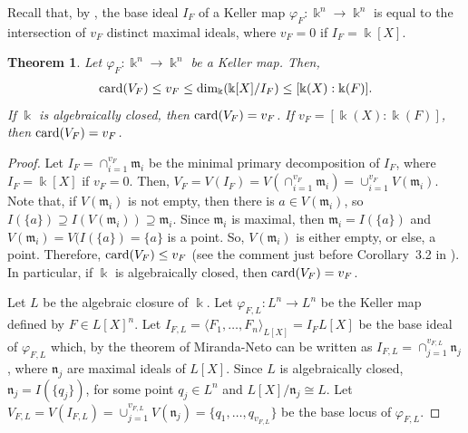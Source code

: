 \documentclass[11pt,reqno]{amsart}
\newtheorem{theorem}{Theorem}[section]
\theoremstyle{definition}
\newcommand{\mbk}{\mbox{$\Bbbk$}}
\newcommand{\mfm}{\mbox{$\mathfrak{m}$}}
\newcommand{\mfn}{\mbox{$\mathfrak{n}$}}
\newcommand{\card}{\mbox{${\rm card}$}}
\begin{document}
Recall that, by \cite[Theorem~3.1]{mn}, the base ideal $I_F$ of a Keller map $\varphi_F:\mbk^n\to\mbk^n$
is equal to the intersection of $v_F$ distinct maximal ideals, where $v_F=0$ if $I_F=\mbk[X]$.

\begin{theorem}\label{theo:mpd}
Let $\varphi_F:\mbk^n\to\mbk^n$ be a Keller map. Then, 
\begin{eqnarray*}
\card(V_F)\leq v_F\leq \dim_{\Bbbk}(\mbk[X]/I_F)\leq [\mbk(X):\mbk(F)].
\end{eqnarray*}
If $\mbk$ is algebraically closed, then $\card(V_F)=v_F$. 
If $v_F=[\mbk(X):\mbk(F)]$, then $\card(V_F)=v_F$. 
\end{theorem}
\begin{proof}
Let $I_F=\cap_{i=1}^{v_F}\mfm_i$ be the minimal primary decomposition of $I_F$, where 
$I_F=\mbk[X]$ if $v_F=0$. Then, $V_F=V(I_F)=V(\cap_{i=1}^{v_F}\mfm_i)=\cup_{i=1}^{v_F}V(\mfm_i)$. 
Note that, if $V(\mfm_i)$ is not empty, then there is $a\in V(\mfm_i)$, so $I(\{a\})\supseteq I(V(\mfm_i))\supseteq \mfm_i$. Since $\mfm_i$ is maximal, then $\mfm_i=I(\{a\})$ and
$V(\mfm_i)=V(I(\{a\})=\{a\}$ is a point. So, $V(\mfm_i)$ is either empty, or else, a point. Therefore, $\card(V_F)\leq v_F$ (see the comment just before Corollary~3.2 in \cite{mn}). In particular, if $\mbk$ is algebraically closed, then $\card(V_F)=v_F$. 

Let $L$ be the algebraic closure of $\mbk$. Let $\varphi_{F,L}:L^n\to L^n$ be the Keller map defined by $F\in L[X]^n$. Let $I_{F,L}=\langle F_1,\ldots,F_n\rangle_{L[X]}=I_FL[X]$ be the base ideal of $\varphi_{F,L}$ which, by the theorem of Miranda-Neto \cite[Theorem~3.1]{mn} can be written as $I_{F,L}=\cap_{j=1}^{v_{F,L}}\mfn_j$, where $\mfn_j$ are maximal ideals of $L[X]$. 
Since $L$ is algebraically closed, $\mfn_j=I(\{q_j\})$, for some point $q_j\in L^n$
and $L[X]/\mfn_j\cong L$. Let $V_{F,L}=V(I_{F,L})=\cup_{j=1}^{v_{F,L}}V(\mfn_j)=\{q_1,\ldots,q_{v_{F,L}}\}$ be the base locus of $\varphi_{F,L}$. 


\end{proof}
\end{document}
